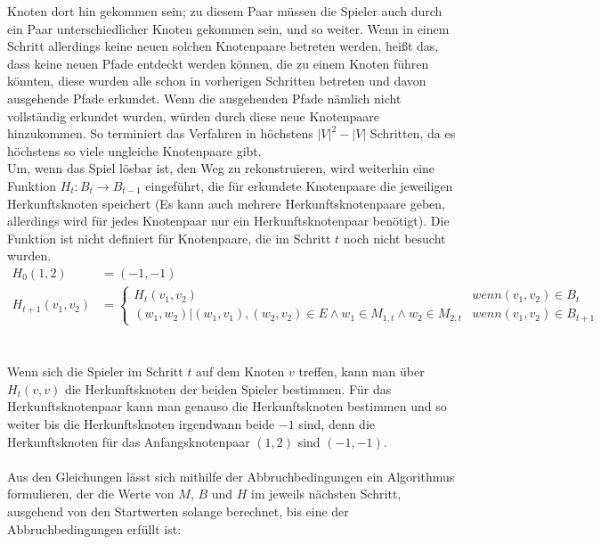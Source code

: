 \documentclass[a4paper,10pt,ngerman]{scrartcl}
\begin{document}
Knoten dort hin gekommen sein; zu diesem Paar müssen die Spieler auch durch ein Paar unterschiedlicher Knoten gekommen sein,
und so weiter. Wenn in einem Schritt allerdings keine neuen solchen Knotenpaare betreten werden, heißt das, dass keine neuen
Pfade entdeckt werden können, die zu einem Knoten führen könnten, diese wurden alle schon in vorherigen Schritten betreten und
davon ausgehende Pfade erkundet. Wenn die ausgehenden Pfade nämlich nicht vollständig erkundet wurden, würden durch diese neue
Knotenpaare hinzukommen. So terminiert das Verfahren in höchstens $|V|^2 - |V|$ Schritten, da es höchstens so viele ungleiche Knotenpaare gibt. \\
Um, wenn das Spiel lösbar ist, den Weg zu rekonstruieren, wird weiterhin eine  Funktion $H_t:B_t \rightarrow B_{t-1}$ eingeführt,
die für erkundete Knotenpaare die jeweiligen Herkunftsknoten speichert (Es kann auch mehrere Herkunftsknotenpaare geben, allerdings wird für
jedes Knotenpaar nur ein Herkunftsknotenpaar benötigt). Die Funktion ist nicht definiert für Knotenpaare, die im Schritt $t$ noch nicht besucht wurden.
\begin{align*}
  H_0(1,2)         & = (-1, -1)                                                                                                        \\
  H_{t+1}(v_1,v_2) & = \begin{cases}
                         H_{t}(v_1, v_2)                                                                    & wenn (v_1,v_2) \in B_t     \\
                         (w_1, w_2)|(w_1,v_1), (w_2,v_2) \in E \land w_1 \in M_{1,t} \land w_2 \in M_{2, t} & wenn (v_1,v_2) \in B_{t+1}
                       \end{cases}
\end{align*}\\\\
Wenn sich die Spieler im Schritt $t$ auf dem Knoten $v$ treffen, kann man über $H_{t}(v,v)$ die Herkunftsknoten der
beiden Spieler bestimmen. Für das Herkunftsknotenpaar kann man genauso die Herkunftsknoten bestimmen und so weiter
bis die Herkunftsknoten irgendwann beide $-1$ sind, denn die Herkunftsknoten für das Anfangsknotenpaar $(1,2)$ sind $(-1, -1)$.\\\\
Aus den Gleichungen lässt sich mithilfe der Abbruchbedingungen ein Algorithmus formulieren, der die Werte von $M$, $B$
und $H$ im jeweils nächsten Schritt, ausgehend von den Startwerten solange berechnet, bis eine der Abbruchbedingungen erfüllt ist:
\end{document}

